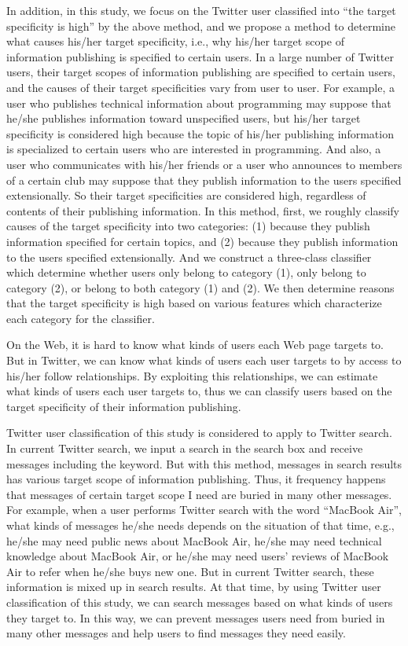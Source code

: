 In addition, in this study, we focus on the Twitter user classified into
``the target specificity is high'' by the above method, and we propose a
method to determine what causes his/her target specificity, i.e., why
his/her target scope of information publishing is specified to certain
users.  In a large number of Twitter users, their target scopes of
information publishing are specified to certain users, and the causes of
their target specificities vary from user to user.  For example, a user
who publishes technical information about programming may suppose that
he/she publishes information toward unspecified users, but his/her
target specificity is considered high because the topic of his/her
publishing information is specialized to certain users who are
interested in programming.  And also, a user who communicates with
his/her friends or a user who announces to members of a certain club may
suppose that they publish information to the users specified
extensionally. So their target specificities are considered high,
regardless of contents of their publishing information.  In this method,
first, we roughly classify causes of the target specificity into two
categories: (1) because they publish information specified for certain
topics, and (2) because they publish information to the users specified
extensionally. And we construct a three-class classifier which determine
whether users only belong to category (1), only belong to category (2),
or belong to both category (1) and (2).  We then determine reasons that
the target specificity is high based on various features which
characterize each category for the classifier.

On the Web, it is hard to know what kinds of users each Web page targets
to.  But in Twitter, we can know what kinds of users each user targets
to by access to his/her follow relationships.  By exploiting this
relationships, we can estimate what kinds of users each user targets to,
thus we can classify users based on the target specificity of their
information publishing.

Twitter user classification of this study is considered to apply to
Twitter search.  In current Twitter search, we input a search in the
search box and receive messages including the keyword.  But with this
method, messages in search results has various target scope of
information publishing.  Thus, it frequency happens that messages of
certain target scope I need are buried in many other messages. For
example, when a user performs Twitter search with the word ``MacBook
Air'', what kinds of messages he/she needs depends on the situation of
that time, e.g., he/she may need public news about MacBook Air, he/she
may need technical knowledge about MacBook Air, or he/she may need
users' reviews of MacBook Air to refer when he/she buys new one.  But in
current Twitter search, these information is mixed up in search results.
At that time, by using Twitter user classification of this study, we can
search messages based on what kinds of users they target to.  In this
way, we can prevent messages users need from buried in many other
messages and help users to find messages they need easily.

